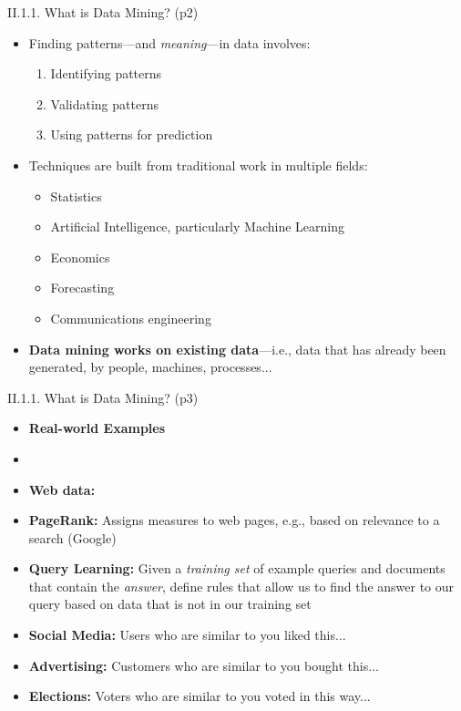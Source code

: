 \documentclass[handout]{beamer}
\newcommand{\strong}[1]{\textbf{\color{teal} #1}}
\newcommand{\stronger}[1]{\textbf{\color{purple} #1}}
\begin{document}
\begin{frame}{II.1.1. What is Data Mining? (p2)}
\begin{itemize}
\item Finding patterns---and \emph{meaning}---in data involves:
	\begin{enumerate}
	\item Identifying patterns
	\item Validating patterns
	\item Using patterns for prediction
	\end{enumerate}
\item Techniques are built from traditional work in multiple fields:
	\begin{itemize}
	\item Statistics
	\item Artificial Intelligence, particularly Machine Learning
	\item Economics
	\item Forecasting
	\item Communications engineering
	\end{itemize}
\item \strong{Data mining works on existing data}---i.e., data that has already been generated, by people, machines, processes...
\end{itemize}
\end{frame}
\begin{frame}{II.1.1. What is Data Mining? (p3)}
\begin{itemize}
\item[] \strong{Real-world Examples}
\item[]
\item[] \stronger{Web data:}
\item \textbf{PageRank:} Assigns measures to web pages, e.g., based on relevance to a search (Google)
\item \textbf{Query Learning:} Given a \emph{training set} of example queries and documents that contain the \emph{answer}, define rules that allow us to find the answer to our query based on data that is not in our training set
\item \textbf{Social Media:} Users who are similar to you liked this...
\item \textbf{Advertising:} Customers who are similar to you bought this...
\item \textbf{Elections:} Voters who are similar to you voted in this way...
\end{itemize}
\end{frame}
\end{document}

